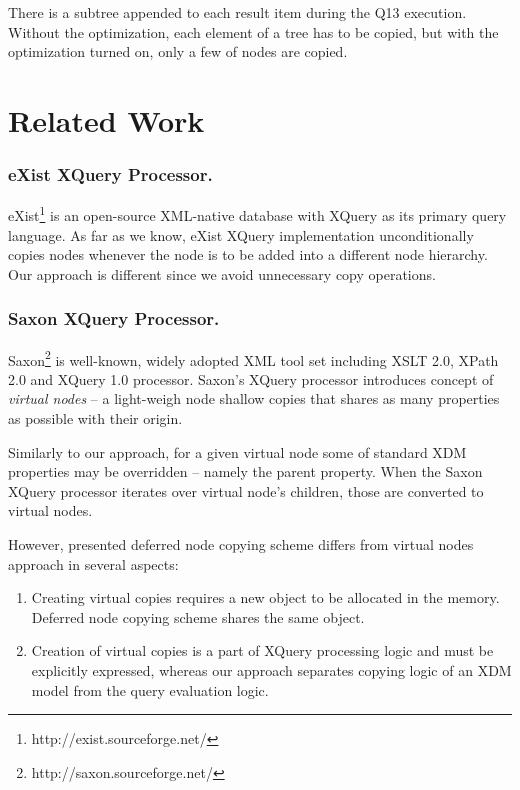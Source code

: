 \documentclass{llncs}
\begin{document}
There is a subtree appended to each result item during the Q13 execution. 
Without the optimization, each element of a tree has to be copied, but with
the optimization turned on, only a few of nodes are copied. 
    
\section{Related Work}

\subsubsection{eXist XQuery Processor.}
eXist\footnote{http://exist.sourceforge.net/} is an open-source XML-native
database with XQuery as its primary query language. As far as we know, 
eXist XQuery implementation unconditionally copies nodes whenever 
the node is to be added into a different node hierarchy. Our approach is 
different since we avoid unnecessary copy operations. 

\subsubsection{Saxon XQuery Processor.}
\label{sec:related}
Saxon\footnote{http://saxon.sourceforge.net/} is well-known, widely adopted XML tool set including XSLT 2.0, XPath 2.0
and XQuery 1.0 processor. Saxon's XQuery processor introduces concept of
{\em virtual nodes} -- a light-weigh node shallow copies that shares as many properties
as possible with their origin. 

Similarly to our approach, for a given virtual node some of standard XDM properties 
may be overridden  -- namely the parent property. When the Saxon XQuery processor
iterates over virtual node's children, those are converted to virtual nodes.

However, presented deferred node copying scheme differs from 
virtual nodes approach in several aspects: 
\begin{enumerate}
  \item 
    Creating virtual copies requires a new object to be allocated
    in the memory. Deferred node copying scheme shares the same object.
  \item   
    Creation of virtual copies is a part of XQuery processing logic
    and must be explicitly expressed, whereas our approach separates
    copying logic of an XDM model from the query evaluation logic. 
\end{enumerate}
\end{document}
